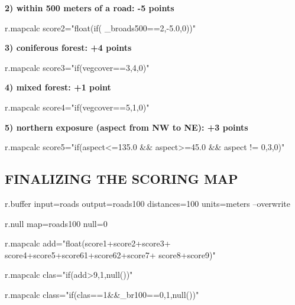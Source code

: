 \textbf{
2) within 500 meters of a road: -5 points}
\begin{smallverbatim}
r.mapcalc score2="float(if(
 _broads500==2,-5.0,0))"
\end{smallverbatim}

\textbf{
3) coniferous forest: +4 points}
\begin{smallverbatim}
r.mapcalc score3="if(vegcover==3,4,0)"
\end{smallverbatim}

\textbf{
4) mixed forest: +1 point}
\begin{smallverbatim}
r.mapcalc score4="if(vegcover==5,1,0)"
\end{smallverbatim}

\textbf{
5) northern exposure (aspect from NW to NE): +3 points}
\begin{smallverbatim}
r.mapcalc score5="if(aspect<=135.0 && aspect>=45.0
 && aspect != 0,3,0)"
\end{smallverbatim}

% 
% 
% 

\subsection{FINALIZING THE SCORING MAP}

\begin{smallverbatim}
r.buffer input=roads output=roads100
 distances=100 units=meters --overwrite

r.null map=roads100 null=0

r.mapcalc add="float(score1+score2+score3+
 score4+score5+score61+score62+score7+
score8+score9)"

r.mapcalc clas="if(add>9,1,null())"

r.mapcalc class="if(clas==1&&_br100==0,1,null())"
\end{smallverbatim}

